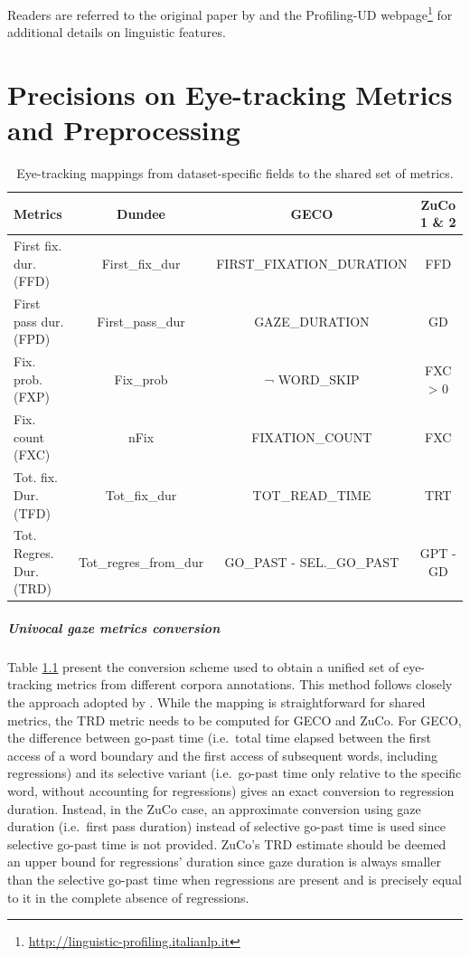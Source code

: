\documentclass[a4paper, nobind]{templates/ociamthesis}
\begin{document}
Readers are referred to the original paper by \textcite{brunato-etal-2020-profiling} and the Profiling-UD webpage\footnote{\href{http://linguistic-\%20profiling.italianlp.it}{http://linguistic-profiling.italianlp.it}} for additional details on linguistic features.

\hypertarget{app:et-metrics}{%
\chapter{Precisions on Eye-tracking Metrics and Preprocessing}\label{app:et-metrics}}

\begin{table}[!h]

\caption{\label{tab:et-mappings}Eye-tracking mappings from dataset-specific fields to the shared set of metrics.}
\centering
\fontsize{11}{13}\selectfont
\begin{tabular}[t]{lccc}
\toprule
\textbf{Metrics} & \textbf{Dundee} & \textbf{GECO} & \textbf{ZuCo 1 \& 2}\\
\midrule
First fix. dur. (FFD) & First\_fix\_dur & FIRST\_FIXATION\_DURATION & FFD\\
First pass dur. (FPD) & First\_pass\_dur & GAZE\_DURATION & GD\\
Fix. prob. (FXP) & Fix\_prob & ¬ WORD\_SKIP & FXC > 0\\
Fix. count (FXC) & nFix & FIXATION\_COUNT & FXC\\
Tot. fix. Dur. (TFD) & Tot\_fix\_dur & TOT\_READ\_TIME & TRT\\
Tot. Regres. Dur. (TRD) & Tot\_regres\_from\_dur & GO\_PAST - SEL.\_GO\_PAST & GPT - GD\\
\bottomrule
\end{tabular}
\end{table}

\paragraph{Univocal gaze metrics conversion} Table \ref{tab:et-mappings} present the conversion scheme used to obtain a unified set of eye-tracking metrics from different corpora annotations. This method follows closely the approach adopted by \textcite{hollenstein-zhang-2019-entity}. While the mapping is straightforward for shared metrics, the TRD metric needs to be computed for GECO and ZuCo. For GECO, the difference between go-past time (i.e.~total time elapsed between the first access of a word boundary and the first access of subsequent words, including regressions) and its selective variant (i.e.~go-past time only relative to the specific word, without accounting for regressions) gives an exact conversion to regression duration. Instead, in the ZuCo case, an approximate conversion using gaze duration (i.e.~first pass duration) instead of selective go-past time is used since selective go-past time is not provided. ZuCo's TRD estimate should be deemed an upper bound for regressions' duration since gaze duration is always smaller than the selective go-past time when regressions are present and is precisely equal to it in the complete absence of regressions.
\end{document}
